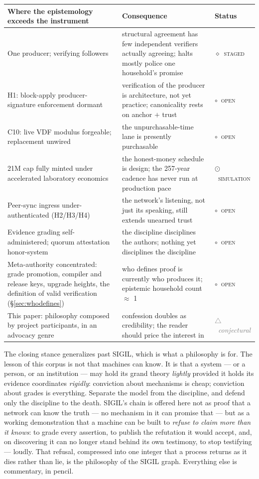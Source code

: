 \documentclass[10pt,a4paper]{article}
\newcommand{\stS}{\textcolor{sigilblue}{$\odot$}~{\scriptsize\textcolor{sigilblue}{\textsc{simulation}}}}
\newcommand{\stG}{\textcolor{sigilviolet}{$\diamond$}~{\scriptsize\textcolor{sigilviolet}{\textsc{staged}}}}
\newcommand{\stO}{\textcolor{sigilamber}{$\circ$}~{\scriptsize\textcolor{sigilamber}{\textsc{open}}}}
\newcommand{\stC}{{\scriptsize\textcolor{gray}{$\triangle$~\textit{conjectural}}}}
\begin{document}
\begin{center}
\small
{}
\renewcommand{\arraystretch}{1.45}
\begin{tabularx}{\textwidth}{@{}>{\RaggedRight\arraybackslash}p{6.2cm}>{\RaggedRight\arraybackslash}X l@{}}
\toprule
Where the epistemology exceeds the instrument & Consequence & Status \\
\midrule
One producer; verifying followers & structural agreement has few independent
verifiers actually agreeing; halts mostly police one household's promise & \stG \\
H1: block-apply producer-signature enforcement dormant & verification of the
producer is architecture, not yet practice; canonicality rests on anchor $+$
trust & \stO \\
C10: live VDF modulus forgeable; replacement unwired & the unpurchasable-time
lane is presently purchasable & \stO \\
21M cap fully minted under accelerated laboratory economics & the honest-money
schedule is design; the 257-year cadence has never run at production pace & \stS \\
Peer-sync ingress under-authenticated (H2/H3/H4) & the network's listening, not
just its speaking, still extends unearned trust & \stO \\
Evidence grading self-administered; quorum attestation honor-system & the
discipline disciplines the authors; nothing yet disciplines the discipline & \stO \\
Meta-authority concentrated: grade promotion, compiler and release keys, upgrade
heights, the definition of valid verification (\S\ref{sec:whodefines}) & who
defines proof is currently who produces it; epistemic household count $\approx$ 1 & \stO \\
This paper: philosophy composed by project participants, in an advocacy genre &
confession doubles as credibility; the reader should price the interest in &
\stC \\
\bottomrule
\end{tabularx}
\end{center}

The closing stance generalizes past SIGIL, which is what a philosophy is for. The
lesson of this corpus is not that machines can know. It is that a system — or a
person, or an institution — may hold its grand theory \emph{lightly} provided it
holds its evidence coordinates \emph{rigidly}: conviction about mechanisms is cheap;
conviction about grades is everything. Separate the model from the discipline, and
defend only the discipline to the death. SIGIL's chain is offered here not as
proof that a network can know the truth — no mechanism in it can promise that —
but as a working demonstration that a machine can be built to \emph{refuse to
claim more than it knows}: to grade every assertion, to publish the refutation it
would accept, and, on discovering it can no longer stand behind its own testimony,
to stop testifying — loudly. That refusal, compressed into one integer that a
process returns as it dies rather than lie, is the philosophy of the SIGIL graph.
Everything else is commentary, in pencil.
\end{document}
